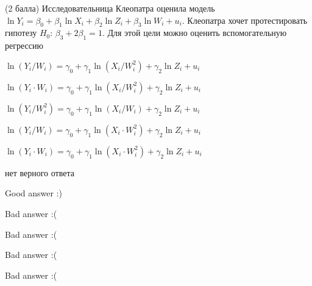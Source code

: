 
\begin{question}
(2 балла) Исследовательница Клеопатра оценила модель
\(\ln Y_i = \beta_0 + \beta_1 \ln X_i + \beta_2 \ln Z_i + \beta_3 \ln W_i + u_i\).
Клеопатра хочет протестировать гипотезу \(H_0\):
\(\beta_3 + 2\beta_1 = 1\). Для этой цели можно оценить вспомогательную
регрессию
\begin{answerlist}[2]
  \item \(\ln(Y_i/W_i) = \gamma_0 + \gamma_1 \ln(X_i/W_i^2) + \gamma_2 \ln{Z_i} + u_i\)
  \item \(\ln(Y_i \cdot W_i) = \gamma_0 + \gamma_1 \ln (X_i/W_i^2) + \gamma_2 \ln Z_i + u_i\)
  \item \(\ln(Y_i/W_i^2) = \gamma_0 + \gamma_1 \ln (X_i/W_i) + \gamma_2 \ln Z_i + u_i\)
  \item \(\ln(Y_i/W_i) = \gamma_0 + \gamma_1 \ln (X_i \cdot W_i^2) + \gamma_2 \ln Z_i + u_i\)
  \item \(\ln(Y_i \cdot W_i) = \gamma_0 + \gamma_1 \ln (X_i \cdot W_i^2) + \gamma_2 \ln Z_i + u_i\)
  \item нет верного ответа
\end{answerlist}
\end{question}

\begin{solution}
\begin{answerlist}
  \item Good answer :)
  \item Bad answer :(
  \item Bad answer :(
  \item Bad answer :(
  \item Bad answer :(
\end{answerlist}
\end{solution}
